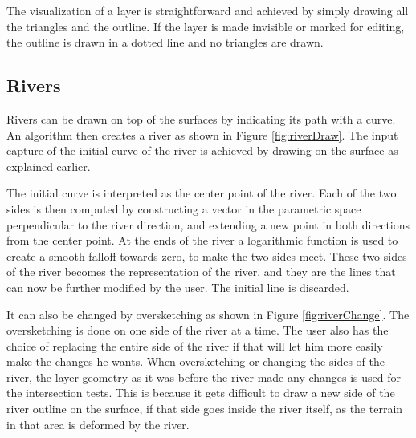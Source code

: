 \documentclass[a4paper,12pt]{report}
\begin{document}
The visualization of a layer is straightforward and achieved by simply drawing all the triangles and the outline. If the layer is made invisible or marked for editing, the outline is drawn in a dotted line and no triangles are drawn.

\subsection{Rivers}
Rivers can be drawn on top of the surfaces by indicating its path with a curve. An algorithm then creates a river as shown in Figure \ref{fig:riverDraw}. 
The input capture of the initial curve of the river is achieved by drawing on the surface as explained earlier.

The initial curve is interpreted as the center point of the river. Each of the two sides is then computed by constructing a vector in the parametric space perpendicular to the river direction, and extending a new point in both directions from the center point. At the ends of the river a logarithmic function is used to create a smooth falloff towards zero, to make the two sides meet. These two sides of the river becomes the representation of the river, and they are the lines that can now be further modified by the user. The initial line is discarded.



It can also be changed by oversketching as shown in Figure \ref{fig:riverChange}. The oversketching is done on one side of the river at a time. The user also has the choice of replacing the entire side of the river if that will let him more easily make the changes he wants.
When oversketching or changing the sides of the river, the layer geometry as it was before the river made any changes is used for the intersection tests. This is because it gets difficult to draw a new side of the river outline on the surface, if that side goes inside the river itself, as the terrain in that area is deformed by the river.
\end{document}

